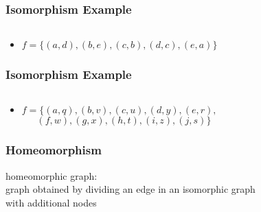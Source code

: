 \documentclass[dvipsnames]{beamer}
\begin{document}
\begin{frame}
  \frametitle{Isomorphism Example}

  \begin{example}
    \begin{columns}
      \begin{center}
      \end{center}

      \begin{center}
      \end{center}
    \end{columns}

    \pause
    \bigskip
    \begin{itemize}
      \item $f = \{(a,d),(b,e),(c,b),(d,c),(e,a)\}$
    \end{itemize}
  \end{example}
\end{frame}

\begin{frame}
  \frametitle{Isomorphism Example}

  \begin{example}
    \begin{columns}
      \begin{center}
      \end{center}

      \begin{center}
      \end{center}
    \end{columns}

    \pause
    \bigskip
    \begin{itemize}
      \item $f = \{(a,q),(b,v),(c,u),(d,y),(e,r),$\\
        $~~~~~~~(f,w),(g,x),(h,t),(i,z),(j,s)\}$
    \end{itemize}
  \end{example}
\end{frame}

\begin{frame}
  \frametitle{Homeomorphism}

  \begin{definition}
    \alert{homeomorphic graph}:\\
    graph obtained by dividing an edge in an isomorphic graph\\
    with additional nodes
  \end{definition}
\end{frame}
\end{document}
